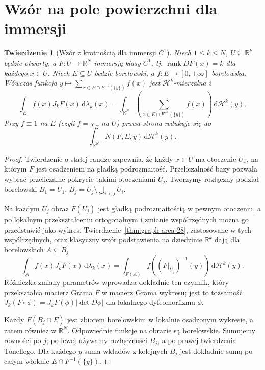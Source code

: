 \documentclass[11pt,a4paper,oneside]{book}
\numberwithin{equation}{chapter}
\theoremstyle{plain}
\newtheorem{twierdzenie}{Twierdzenie}[chapter]
\theoremstyle{definition}
\theoremstyle{remark}
\begin{document}
\section{Wzór na pole powierzchni dla immersji}
\begin{twierdzenie}[Wzór z krotnością dla immersji $C^1$]
\label{thm:immersion-area-28}
Niech $1\le k\le N$, $U\subseteq\mathbb R^k$
będzie otwarty, a $F:U\to\mathbb R^N$
immersją klasy $C^1$, tj.
$\operatorname{rank}DF(x)=k$ dla każdego $x\in U$.
Niech $E\subseteq U$ będzie borelowski,
a $f:E\to[0,+\infty]$ borelowska.
Wówczas funkcja
$y\mapsto\sum_{x\in E\cap F^{-1}(\{y\})}f(x)$
jest $\mathcal H^k$-mierzalna i
\begin{equation}\label{eq:area-immersion-28}
 \int_E f(x)J_kF(x)\,\mathrm d\lambda_k(x)
 =\int_{\mathbb R^N}\left(
 \sum_{x\in E\cap F^{-1}(\{y\})}f(x)\right)
 \,\mathrm d\mathcal H^k(y).
\end{equation}
Przy $f\equiv1$ na $E$ (czyli $f=\chi_E$ na $U$)
prawa strona redukuje się do
\[
 \int_{\mathbb R^N} N(F,E,y)\,\mathrm d\mathcal H^k(y).
\]
\end{twierdzenie}
\begin{proof}
Twierdzenie o stałej randze zapewnia, że każdy
$x\in U$ ma otoczenie $U_x$, na którym $F$
jest osadzeniem na gładką podrozmaitość.
Przeliczalność bazy pozwala wybrać przeliczalne
pokrycie takimi otoczeniami $U_j$. Tworzymy
rozłączny podział borelowski
$B_1=U_1$, $B_j=U_j\setminus\bigcup_{i<j}U_i$.

Na każdym $U_j$ obraz $F(U_j)$ jest gładką
podrozmaitością w pewnym otoczeniu, a po
lokalnym przekształceniu ortogonalnym i zmianie
współrzędnych można go przedstawić jako wykres.
Twierdzenie~\ref{thm:graph-area-28}, zastosowane
w tych współrzędnych, oraz klasyczny wzór
podstawienia na dziedzinie $\mathbb R^k$
dają dla borelowskich $A\subseteq B_j$
\[
 \int_A f(x)J_kF(x)\,\mathrm d\lambda_k(x)
 =\int_{F(A)}f((F|_{U_j})^{-1}(y))
 \,\mathrm d\mathcal H^k(y).
\]
Różniczka zmiany parametrów wprowadza dokładnie
ten czynnik, który przekształca macierz Grama
$F$ w macierz Grama wykresu; jest to tożsamość
$J_k(F\circ\phi)=J_kF(\phi)|\det D\phi|$
dla lokalnego dyfeomorfizmu $\phi$.

Każdy $F(B_j\cap E)$ jest zbiorem borelowskim
w lokalnie osadzonym wykresie, a zatem również
w $\mathbb R^N$. Odpowiednie funkcje na obrazie
są borelowskie. Sumujemy równości po $j$;
po lewej używamy rozłączności $B_j$, a po prawej
twierdzenia Tonellego. Dla każdego $y$ suma
wkładów z kolejnych $B_j$ jest dokładnie sumą
po całym włóknie $E\cap F^{-1}(\{y\})$.
\end{proof}
\end{document}
